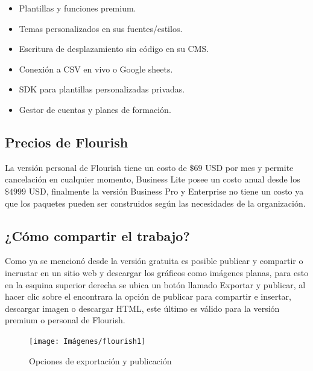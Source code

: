 \documentclass[
]{book}
\providecommand{\tightlist}{%
  \setlength{\itemsep}{0pt}\setlength{\parskip}{0pt}}
\begin{document}
\begin{itemize}
  \begin{itemize}
  \tightlist
  \item
    Plantillas y funciones premium.
  \item
    Temas personalizados en sus fuentes/estilos.
  \item
    Escritura de desplazamiento sin código en su CMS.
  \item
    Conexión a CSV en vivo o Google sheets.
  \item
    SDK para plantillas personalizadas privadas.
  \item
    Gestor de cuentas y planes de formación.
  \end{itemize}
\end{itemize}

\hypertarget{precios-de-flourish}{%
\subsection{Precios de Flourish}\label{precios-de-flourish}}

La versión personal de Flourish tiene un costo de \(\$69\) USD por mes y permite cancelación en cualquier momento, Business Lite posee un costo anual desde los \(\$4999\) USD, finalmente la versión Business Pro y Enterprise no tiene un costo ya que los paquetes pueden ser construidos según las necesidades de la organización.

\hypertarget{cuxf3mo-compartir-el-trabajo}{%
\subsection{¿Cómo compartir el trabajo?}\label{cuxf3mo-compartir-el-trabajo}}

Como ya se mencionó desde la versión gratuita es posible publicar y compartir o incrustar en un sitio web y descargar los gráficos como imágenes planas, para esto en la esquina superior derecha se ubica un botón llamado Exportar y publicar, al hacer clic sobre el encontrara la opción de publicar para compartir e insertar, descargar imagen o descargar HTML, este último es válido para la versión premium o personal de Flourish.

\begin{figure}

{\centering \texttt{[image: Imágenes/flourish1]} 

}

\caption{Opciones de exportación y publicación}\label{fig:compartirtrabajoflourish-fig}
\end{figure}
\end{document}
